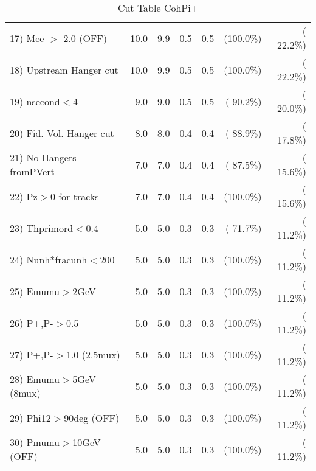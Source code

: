 \begin{table}[h!]
\begin{tabular}{||l||r|r|r|r|r|r||}
 17) Mee $>$ 2.0  (OFF)   &         10.0 &          9.9 &          0.5 &          0.5 & (100.0\%) & ( 22.2\%) \\
 18) Upstream Hanger cut  &         10.0 &          9.9 &          0.5 &          0.5 & (100.0\%) & ( 22.2\%) \\
 19) nsecond$<$4          &          9.0 &          9.0 &          0.5 &          0.5 & ( 90.2\%) & ( 20.0\%) \\
 20) Fid. Vol. Hanger cut &          8.0 &          8.0 &          0.4 &          0.4 & ( 88.9\%) & ( 17.8\%) \\
 21) No Hangers fromPVert &          7.0 &          7.0 &          0.4 &          0.4 & ( 87.5\%) & ( 15.6\%) \\
 22) Pz$>$0 for tracks    &          7.0 &          7.0 &          0.4 &          0.4 & (100.0\%) & ( 15.6\%) \\
 23) Thprimord$<$0.4      &          5.0 &          5.0 &          0.3 &          0.3 & ( 71.7\%) & ( 11.2\%) \\
 24) Nunh*fracunh$<$200   &          5.0 &          5.0 &          0.3 &          0.3 & (100.0\%) & ( 11.2\%) \\
 25) Emumu$>$2GeV         &          5.0 &          5.0 &          0.3 &          0.3 & (100.0\%) & ( 11.2\%) \\
 26) P+,P-$>$0.5          &          5.0 &          5.0 &          0.3 &          0.3 & (100.0\%) & ( 11.2\%) \\
 27) P+,P-$>$1.0 (2.5mux) &          5.0 &          5.0 &          0.3 &          0.3 & (100.0\%) & ( 11.2\%) \\
 28) Emumu$>$5GeV  (8mux) &          5.0 &          5.0 &          0.3 &          0.3 & (100.0\%) & ( 11.2\%) \\
 29) Phi12$>$90deg  (OFF) &          5.0 &          5.0 &          0.3 &          0.3 & (100.0\%) & ( 11.2\%) \\
 30) Pmumu$>$10GeV  (OFF) &          5.0 &          5.0 &          0.3 &          0.3 & (100.0\%) & ( 11.2\%) \\
 \hline
 \hline
 \end{tabular}
 \caption{Cut Table  CohPi+   }
 \label{tab-cutcohjpsi-mumu_nuecc}
 \end{table}
